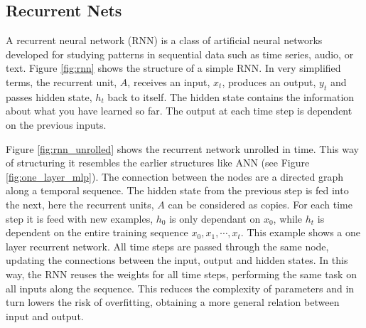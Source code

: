 \subsection{Recurrent Nets} \label{sec:reccurent_nets}


A recurrent neural network (RNN) is a class of artificial neural networks developed for studying patterns in sequential data such as time series, audio, or text. Figure \ref{fig:rnn} shows the structure of a simple RNN. In very simplified terms, the recurrent unit, $A$, receives an input, $x_t$, produces an output, $y_t$ and passes hidden state, $h_t$ back to itself. The hidden state contains the information about what you have learned so far. The output at each time step is dependent on the previous inputs. 


Figure \ref{fig:rnn_unrolled} shows the recurrent network unrolled in time. This way of structuring it resembles the earlier structures like ANN (see Figure \ref{fig:one_layer_mlp}). The connection between the nodes %
are a directed graph along a temporal sequence. The hidden state from the previous step is fed into the next, here the recurrent units, $A$ can be considered as copies. For each time step it is feed with new examples, $h_0$ is only dependant on $x_0$, while $h_t$ is dependent on the entire training sequence $x_0, x_1, \cdots, x_t $. This example shows a one layer recurrent network. All time steps are passed through the same node, updating the connections between the input, output and hidden states. In this way, the RNN reuses the weights for all time steps, performing the same task on all inputs along the sequence. This reduces the complexity of parameters and in turn lowers the risk of overfitting, obtaining a more general relation between input and output.


